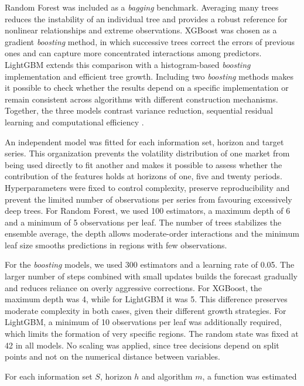 \documentclass[a4paper,fleqn]{cas-sc}
\begin{document}
Random Forest was included as a \textit{bagging} benchmark. Averaging many trees reduces the instability of an individual tree and provides a robust reference for nonlinear relationships and extreme observations. XGBoost was chosen as a gradient \textit{boosting} method, in which successive trees correct the errors of previous ones and can capture more concentrated interactions among predictors. LightGBM extends this comparison with a histogram-based \textit{boosting} implementation and efficient tree growth. Including two \textit{boosting} methods makes it possible to check whether the results depend on a specific implementation or remain consistent across algorithms with different construction mechanisms. Together, the three models contrast variance reduction, sequential residual learning and computational efficiency \citep{Breiman2001RandomForest,ChenGuestrin2016XGBoost,Ke2017LightGBM}.

An independent model was fitted for each information set, horizon and target series. This organization prevents the volatility distribution of one market from being used directly to fit another and makes it possible to assess whether the contribution of the features holds at horizons of one, five and twenty periods. Hyperparameters were fixed to control complexity, preserve reproducibility and prevent the limited number of observations per series from favouring excessively deep trees. For Random Forest, we used 100 estimators, a maximum depth of 6 and a minimum of 5 observations per leaf. The number of trees stabilizes the ensemble average, the depth allows moderate-order interactions and the minimum leaf size smooths predictions in regions with few observations.

For the \textit{boosting} models, we used 300 estimators and a learning rate of 0.05. The larger number of steps combined with small updates builds the forecast gradually and reduces reliance on overly aggressive corrections. For XGBoost, the maximum depth was 4, while for LightGBM it was 5. This difference preserves moderate complexity in both cases, given their different growth strategies. For LightGBM, a minimum of 10 observations per leaf was additionally required, which limits the formation of very specific regions. The random state was fixed at 42 in all models. No scaling was applied, since tree decisions depend on split points and not on the numerical distance between variables.

For each information set \(S\), horizon \(h\) and algorithm \(m\), a function was estimated
\end{document}
